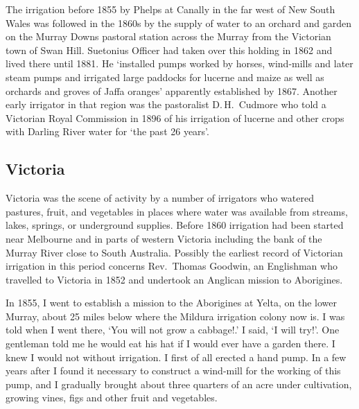 The irrigation before 1855 by Phelps at Canally 
in the far west of New South Wales was followed in the 1860s by the
supply of water to an orchard  and
garden on the Murray Downs 
pastoral station across the Murray from the Victorian town of Swan
Hill.  Suetonius Officer 
had taken over this holding in 1862 and lived there until 1881.  He
`installed pumps worked by horses,
wind-mills and later steam pumps
 and irrigated large paddocks for
lucerne  and maize  as well as orchards and
groves of Jaffa oranges' apparently established by 1867.
Another early irrigator in that region was the pastoralist
D.\,H.~Cudmore  who told a Victorian Royal
Commission in 1896 of his irrigation of lucerne and other crops with
Darling River  water for `the past 26
years'.

\subsection*{Victoria}

Victoria was the scene of activity by a number of irrigators who
watered pastures,  fruit,  and vegetables
 in places where water was available from str\-eams,
lakes, springs, or underground supplies.  Before 1860 irrigation had
been started near Melbourne  and in parts of
western Victoria including the bank of the Murray River
 close to South Australia.  Possibly the earliest
record of Victorian irrigation in this period concerns Rev.\ Thomas
Goodwin,  an Englishman who travelled to Victoria
in 1852 and undertook an Anglican mission to
Aborigines.
\begin{Quote}
	In 1855, I went to establish a mission to the Aborigines at
	Yelta, on the lower Murray, about 25 miles below where the
	Mildura  irrigation colony now is.  I was
	told when I went there, `You will not grow a cabbage!.'  I
	said, `I will try!'.  One gentleman told me he would eat his
	hat if I would ever have a garden there.  I knew I would not
	without irrigation.  I first of all erected a hand pump.
	 In a few years after
	I found it necessary to construct a wind-mill
	 for the working of this
	pump, and I gradually brought about three quarters of an acre
	under cultivation, growing vines, figs and other fruit and
	vegetables.
\end{Quote}

